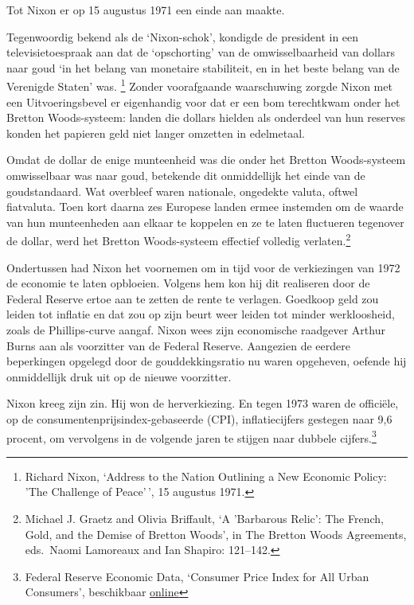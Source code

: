 \documentclass[
  a5paper,
  smalldemyvopaper,11pt,twoside,onecolumn,openright,extrafontsizes]{memoir}
\begin{document}
Tot Nixon er op 15 augustus 1971 een einde aan maakte.

Tegenwoordig bekend als de `Nixon-schok', kondigde de president in een
televisietoespraak aan dat de `opschorting' van de omwisselbaarheid van
dollars naar goud `in het belang van monetaire stabiliteit, en in het
beste belang van de Verenigde Staten' was. \footnote{\hspace{0pt}Richard
  Nixon, `Address to the Nation Outlining a New Economic Policy: 'The
  Challenge of Peace'\,', 15 augustus 1971.} Zonder voorafgaande
waarschuwing zorgde Nixon met een Uitvoeringsbevel er eigenhandig voor
dat er een bom terechtkwam onder het Bretton Woods-systeem: landen die
dollars hielden als onderdeel van hun reserves konden het papieren geld
niet langer omzetten in edelmetaal.

Omdat de dollar de enige munteenheid was die onder het Bretton
Woods-systeem omwisselbaar was naar goud, betekende dit onmiddellijk het
einde van de goudstandaard. Wat overbleef waren nationale, ongedekte
valuta, oftwel fiatvaluta. Toen kort daarna zes Europese landen ermee
instemden om de waarde van hun munteenheden aan elkaar te koppelen en ze
te laten fluctueren tegenover de dollar, werd het Bretton Woods-systeem
effectief volledig verlaten.\footnote{\hspace{0pt}Michael J. Graetz and
  Olivia Briffault, `A 'Barbarous Relic': The French, Gold, and the
  Demise of Bretton Woods', in The Bretton Woods Agreements, eds.~Naomi
  Lamoreaux and Ian Shapiro: 121--142.}

Ondertussen had Nixon het voornemen om in tijd voor de verkiezingen van
1972 de economie te laten opbloeien. Volgens hem kon hij dit realiseren
door de Federal Reserve ertoe aan te zetten de rente te verlagen.
Goedkoop geld zou leiden tot inflatie en dat zou op zijn beurt weer
leiden tot minder werkloosheid, zoals de Phillips-curve aangaf. Nixon
wees zijn economische raadgever Arthur Burns aan als voorzitter van de
Federal Reserve. Aangezien de eerdere beperkingen opgelegd door de
gouddekkingsratio nu waren opgeheven, oefende hij onmiddellijk druk uit
op de nieuwe voorzitter.

Nixon kreeg zijn zin. Hij won de herverkiezing. En tegen 1973 waren de
officiële, op de consumentenprijsindex-gebaseerde (CPI), inflatiecijfers
gestegen naar 9,6 procent, om vervolgens in de volgende jaren te stijgen
naar dubbele cijfers.\footnote{Federal Reserve Economic Data, `Consumer
  Price Index for All Urban Consumers', beschikbaar
  \href{https://fred.stlouisfed.org/series/CPIAUCSL}{online}}
\end{document}
